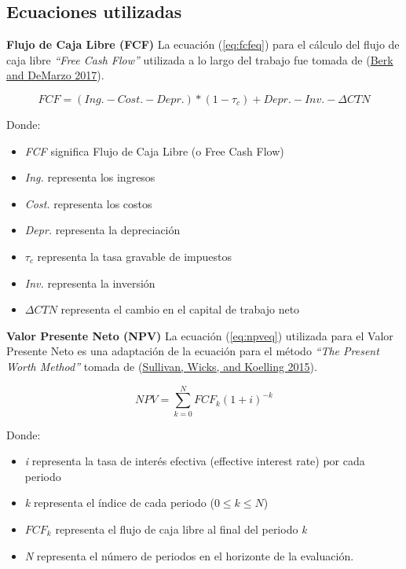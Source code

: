 \documentclass[
]{book}
\providecommand{\tightlist}{%
  \setlength{\itemsep}{0pt}\setlength{\parskip}{0pt}}
\begin{document}
\hypertarget{ecuaciones-utilizadas}{%
\subsection{Ecuaciones utilizadas}\label{ecuaciones-utilizadas}}

\textbf{Flujo de Caja Libre (FCF)}
La ecuación (\eqref{eq:fcfeq}) para el cálculo del flujo de caja libre \emph{``Free Cash Flow''} utilizada a lo largo del trabajo fue tomada de (\protect\hyperlink{ref-Berk2017}{Berk and DeMarzo 2017}).

\begin{equation}
  FCF = (Ing. - Cost. - Depr.) * (1-\tau_{c}) + Depr. - Inv. - \Delta CTN
  \label{eq:fcfeq}
\end{equation}

Donde:

\begin{itemize}
\tightlist
\item
  \emph{FCF} significa Flujo de Caja Libre (o Free Cash Flow)
\item
  \emph{Ing.} representa los ingresos
\item
  \emph{Cost.} representa los costos
\item
  \emph{Depr.} representa la depreciación
\item
  \(\tau_{c}\) representa la tasa gravable de impuestos
\item
  \emph{Inv.} representa la inversión
\item
  \(\Delta CTN\) representa el cambio en el capital de trabajo neto
\end{itemize}

\textbf{Valor Presente Neto (NPV)}
La ecuación (\eqref{eq:npveq}) utilizada para el Valor Presente Neto es una
adaptación de la ecuación para el método \emph{``The Present Worth Method''} tomada de (\protect\hyperlink{ref-Sullivan2015}{Sullivan, Wicks, and Koelling 2015}).

\begin{equation}
  NPV = \sum_{k=0}^{N}FCF_{k} (1+i)^{-k}
  \label{eq:npveq}
\end{equation}

Donde:

\begin{itemize}
\tightlist
\item
  \emph{i} representa la tasa de interés efectiva (effective interest rate) por cada periodo
\item
  \emph{k} representa el índice de cada periodo (\(0 \le k \le N\))
\item
  \(FCF_{k}\) representa el flujo de caja libre al final del periodo \emph{k}
\item
  \emph{N} representa el número de periodos en el horizonte de la evaluación.
\end{itemize}
\end{document}
